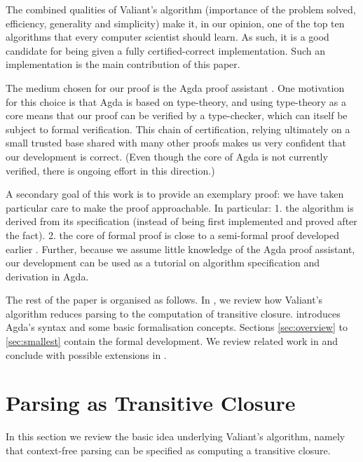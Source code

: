 \documentclass{CSML}
\numberwithin{theorem}{section}
\begin{document}
The combined qualities of Valiant's algorithm (importance of the
problem solved, efficiency, generality and simplicity) make it, in our
opinion, one of the top ten algorithms that every computer scientist
should learn. As such, it is a good candidate for being given a fully
certified-correct implementation. Such an implementation is
the main contribution of this paper.

The medium chosen for our proof is the Agda proof assistant
\citep{norell_practical_2007}. One motivation for this choice is that
Agda is based on type-theory, and using type-theory as a core means that
our proof can be verified by a
type-checker, which can itself be subject to formal
verification. This chain of certification, relying ultimately on a
small trusted base shared with many other proofs makes us very
confident that our development is correct.  (Even though the core of
Agda is not currently verified, there is ongoing effort in this
direction.)

A secondary goal of this work is to provide an exemplary proof: we
have taken particular care to make the proof approachable. In
particular:
1. the algorithm is derived from its specification (instead of being
first implemented and proved after the fact).
2. the core of formal proof is close to a
semi-formal proof developed earlier \citep{bernardy_efficient_2013}.
Further, because we assume little knowledge of the Agda proof
assistant, our development can be used as a tutorial on algorithm
specification and derivation in Agda.




The rest of the paper is organised as follows.  In ,
we review how Valiant's algorithm reduces parsing to the computation
of transitive closure.  introduces
Agda's syntax and some basic formalisation concepts. Sections
\ref{sec:overview} to \ref{sec:smallest} contain the formal
development. We review related work in  and conclude
with possible extensions in .


\section{Parsing as Transitive Closure}\label{sec:charts}
In this section we review the basic idea underlying Valiant's
algorithm, namely that context-free parsing can be specified as
computing a transitive closure.
\end{document}
